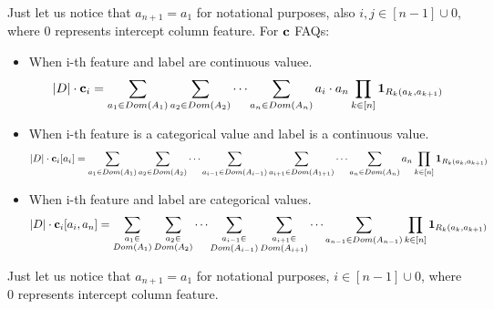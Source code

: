 \documentclass[10pt,a4paper]{article}
\begin{document}
\begin{enumerate}
\begin{itemize}
\end{itemize}
Just let us notice that $a_{n+1}=a_1$ for notational purposes, also $i, j \in [n-1] \cup {0} $, where $0$ represents intercept column feature. 
For $\textbf{\text{{c}}}$ FAQs:
\begin{itemize}
\item When i-th feature and label are  continuous valuee. 
$$|D| \cdot \mathbf{c}_{i}= \sum_{a_1 \in Dom(A_1)} \sum_{a_2 \in Dom(A_2)} \cdots \sum_{a_n \in Dom(A_n)} a_i \cdot a_n 
\prod_{k\in[n]} \textbf{\text{{1}}}_{R_k(a_k, a_{k+1})}$$
\item When i-th feature is a categorical value and label is a continuous value. 
$$|D| \cdot \mathbf{c}_{i}[a_i]= \sum_{a_1 \in Dom(A_1)} \sum_{a_2 \in Dom(A_2)} \cdots 
\sum_{a_{i-1} \in Dom(A_{i-1})}
\sum_{a_{i+1} \in Dom(A_{1+1})}
\cdots
\sum_{a_n \in Dom(A_n)}  a_n 
\prod_{k\in[n]} \textbf{\text{{1}}}_{R_k(a_k, a_{k+1})}$$
\item When i-th feature and label are categorical values. 
$$|D| \cdot \mathbf{c}_{i}[a_i, a_n]= 
\sum_{\substack{a_{1} \in \\Dom(A_{1})}}
\sum_{\substack{a_{2} \in \\Dom(A_{2})}}
\cdots 
\sum_{\substack{a_{i-1} \in \\Dom(A_{i-1})}}
\sum_{\substack{a_{i+1} \in \\Dom(A_{i+1})}}
\cdots
\sum_{a_{n-1} \in Dom(A_{n-1})}  
\prod_{k\in[n]} \textbf{\text{{1}}}_{R_k(a_k, a_{k+1})}$$
\end{itemize}
Just let us notice that $a_{n+1}=a_1$ for notational purposes, $i \in [n-1] \cup {0} $, where $0$ represents intercept column feature. 

\end{enumerate}
\end{document}
